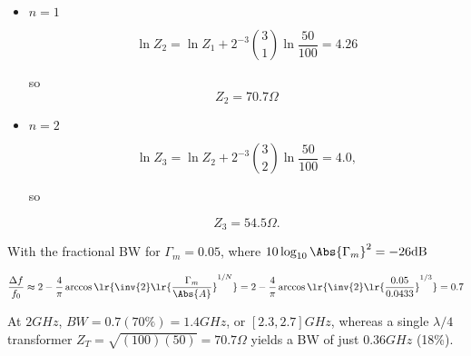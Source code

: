 {\begin{itemize}
so
\begin{equation}\label{eqn:uwavesDeck7MultisectionTransformersCore:520}
Z_1 = 91.7 \Omega
\end{equation}

\item \( n = 1 \)

\begin{dmath}\label{eqn:uwavesDeck7MultisectionTransformersCore:540}
\ln Z_{2}
= \ln Z_1 + 2^{-3} \binom{3}{1} \ln \frac{50}{100} = 4.26
\end{dmath}

so
\begin{dmath}\label{eqn:uwavesDeck7MultisectionTransformersCore:560}
Z_2 = 70.7 \Omega
\end{dmath}

\item \( n = 2 \)

\begin{dmath}\label{eqn:uwavesDeck7MultisectionTransformersCore:580}
\ln Z_{3} = \ln Z_2 + 2^{-3} \binom{3}{2} \ln \frac{50}{100} = 4.0,
\end{dmath}

so

\begin{dmath}\label{eqn:uwavesDeck7MultisectionTransformersCore:600}
Z_3 = 54.5 \Omega.
\end{dmath}

\end{itemize}


With the fractional BW for \( \Gamma_m = 0.05 \), where \( 10 \log_{10} \Abs{\Gamma_m}^2 = -26 \si{dB} \)

\begin{dmath}\label{eqn:uwavesDeck7MultisectionTransformersCore:920}
\frac{\Delta f}{f_0}
\approx 
2 - \frac{4}{\pi} \arccos\lr{ \inv{2} \lr{ \frac{\Gamma_m}{\Abs{A}} }^{1/N} }
=
2 - \frac{4}{\pi} \arccos\lr{ \inv{2} \lr{ \frac{0.05}{0.0433} }^{1/3} }
= 0.7
\end{dmath}

At \( 2 \si{GHz} \), \( BW = 0.7 (70\%) = 1.4 \si{GHz} \), or \( [2.3,2.7] \si{GHz} \), whereas a single \( \lambda/4 \) transformer \( Z_T = \sqrt{ (100)(50) } = 70.7 \Omega \) yields a BW of just \( 0.36 \si{GHz} \) (18\%).

} %

